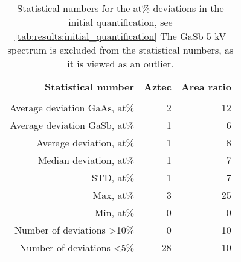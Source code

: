 \begin{table}[phtb]
    \begin{center}
        \caption{
            Statistical numbers for the at\% deviations in the initial quantification, see \cref{tab:results:initial_quantification}
            The GaSb 5 kV spectrum is excluded from the statistical numbers, as it is viewed as an outlier.
        }
        \label{tab:results:stats_initial_quantification}
        \begin{tabular}{rrr}
            \hline
            \textbf{Statistical number}  & \textbf{Aztec} & \textbf{Area ratio} \\
            \emph{}                      & \emph{}        & \emph{}             \\
            \hline
            Average deviation GaAs, at\% & 2              & 12                  \\
            Average deviation GaSb, at\% & 1              & 6                   \\
            Average deviation, at\%      & 1              & 8                   \\
            Median deviation, at\%       & 1              & 7                   \\
            STD, at\%                    & 1              & 7                   \\
            Max, at\%                    & 3              & 25                  \\
            Min, at\%                    & 0              & 0                   \\
            Number of deviations >10\%   & 0              & 10                  \\
            Number of deviations  <5\%   & 28             & 10                  \\
            \hline
        \end{tabular}
    \end{center}
\end{table}
